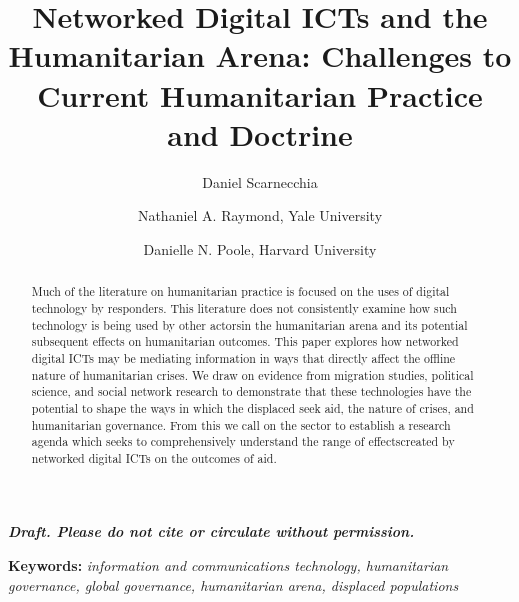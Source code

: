 \documentclass[
]{article}
\title{Networked Digital ICTs and the Humanitarian Arena: Challenges to
Current Humanitarian Practice and Doctrine}
\author{Daniel Scarnecchia \and Nathaniel A. Raymond, Yale
University \and Danielle N. Poole, Harvard University}
\date{}
\begin{document}
\maketitle
\begin{abstract}
Much of the literature on humanitarian practice is focused on the uses
of digital technology by responders. This literature does not
consistently examine how such technology is being used by other actorsin
the humanitarian arena and its potential subsequent effects on
humanitarian outcomes. This paper explores how networked digital ICTs
may be mediating information in ways that directly affect the offline
nature of humanitarian crises. We draw on evidence from migration
studies, political science, and social network research to demonstrate
that these technologies have the potential to shape the ways in which
the displaced seek aid, the nature of crises, and humanitarian
governance. From this we call on the sector to establish a research
agenda which seeks to comprehensively understand the range of
effectscreated by networked digital ICTs on the outcomes of aid.
\end{abstract}

\textbf{\emph{Draft. Please do not cite or circulate without
permission.}}

\textbf{Keywords:} \emph{information and communications technology,
humanitarian governance, global governance, humanitarian arena,
displaced populations}
\end{document}

